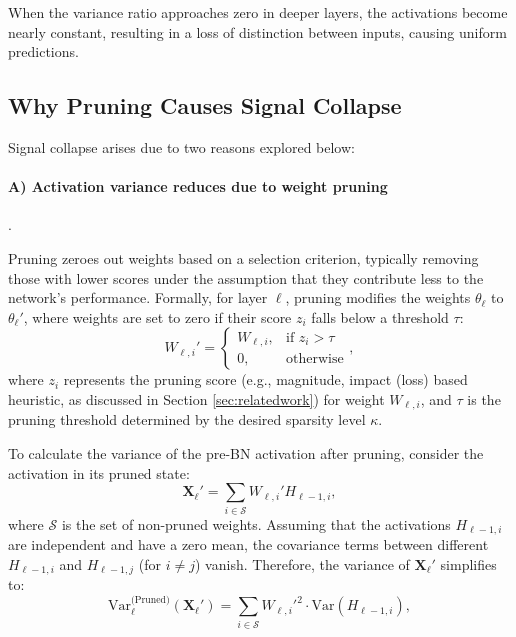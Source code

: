 When the variance ratio approaches zero in deeper layers, the activations become nearly constant, resulting in a loss of distinction between inputs, causing uniform predictions.

\subsection{Why Pruning Causes Signal Collapse}
\label{subsec:mechanisms_signal_collapse}

Signal collapse arises due to two reasons explored below:

\paragraph{A) Activation variance reduces due to weight pruning}.

Pruning zeroes out weights based on a selection criterion, typically removing those with lower scores under the assumption that they contribute less to the network's performance. Formally, for layer \(\ell\), pruning modifies the weights \(\theta_\ell\) to \(\theta_\ell'\), where weights are set to zero if their score \(z_{i}\) falls below a threshold \(\tau\):
\begin{equation}
    W_{\ell,i}' = 
    \begin{cases}
        W_{\ell,i}, & \text{if } z_{i} > \tau \\
        0, & \text{otherwise}
    \end{cases},
    \label{eq:weight_pruning_general}
\end{equation}
where \(z_{i}\) represents the pruning score (e.g., magnitude, impact (loss) based heuristic, as discussed in Section \ref{sec:relatedwork}) for weight \(W_{\ell,i}\), and \(\tau\) is the pruning threshold determined by the desired sparsity level \(\kappa\).

To calculate the variance of the pre-BN activation after pruning, consider the activation in its pruned state:\begin{equation}
\mathbf{X}_\ell' = \sum_{i \in \mathcal{S}} W_{\ell,i}' H_{\ell-1,i},
\end{equation}
where \(\mathcal{S}\) is the set of non-pruned weights. Assuming that the activations \( H_{\ell-1,i} \) are independent and have a zero mean, the covariance terms between different \( H_{\ell-1,i} \) and \( H_{\ell-1,j} \) (for \( i \neq j \)) vanish. Therefore, the variance of \(\mathbf{X}_\ell'\) simplifies to:
\begin{equation}
    \mathrm{Var}_\ell^{\text{(Pruned)}}(\mathbf{X}_\ell') = \sum_{i \in \mathcal{S}} W_{\ell,i}'^2 \cdot \mathrm{Var}(H_{\ell-1,i}),
    \label{eq:pruned_variance}
\end{equation}

